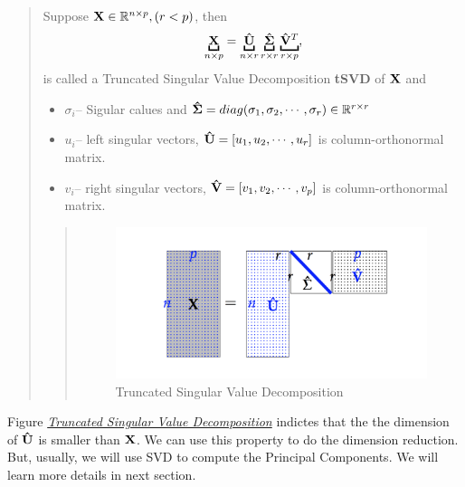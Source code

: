 \documentclass[letterpaper,11pt,english]{sphinxmanual}
\begin{document}
\begin{quote}

Suppose \({\bf X}\in\mathbb{R}^{n\times p},(r<p)\), then
\label{dim:equation-tsvd}\begin{gather}
\begin{split}    \underbracket{\bf X}_{n\times p} =\underbracket{\bf \hat{U}}_{n\times r} \underbracket{\bf\hat{\Sigma}}_{r\times r} \underbracket{{\bf \hat{V}}^T}_{r\times p},\end{split}\label{dim-tsvd}
\end{gather}
is called a Truncated Singular Value Decomposition \textbf{tSVD} of \({\bf X}\) and
\begin{itemize}
\item {} 
\(\sigma_i\)-- Sigular calues and \({\bf\hat{\Sigma}}=diag(\sigma_1,\sigma_2, \cdots, \sigma_r)\in \mathbb{R}^{r\times r}\)

\item {} 
\(u_i\)-- left singular vectors, \({\bf \hat{U}}=[u_1,u_2, \cdots, u_r]\) is column-orthonormal matrix.

\item {} 
\(v_i\)-- right singular vectors, \({\bf \hat{V}}=[v_1,v_2, \cdots, v_p]\) is column-orthonormal matrix.

\end{itemize}
\begin{quote}
\begin{figure}[htbp]
\centering
\capstart

\includegraphics{tsvd.png}
\caption{Truncated Singular Value Decomposition}\label{dim:fig-tsvd}\end{figure}
\end{quote}
\end{quote}

Figure {\hyperref[dim:fig-tsvd]{\emph{Truncated Singular Value Decomposition}}} indictes that the the dimension of \({\bf \hat{U}}\) is smaller than \({\bf X}\). We can use this property to do the dimension reduction. But, usually, we will use SVD
to compute the Principal Components. We will learn more details in next section.
\end{document}
